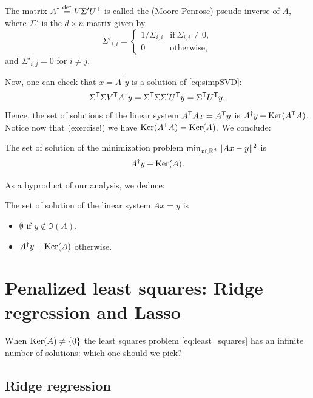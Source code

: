 \documentclass[11pt,nocut]{article}
\begin{document}
\begin{definition}
	The matrix $A^{\dagger} \overset{\rm def}{=} V \Sigma' U^{{\sf T}}$ is called the (Moore-Penrose) pseudo-inverse of $A$, where $\Sigma'$ is the $d \times n$ matrix given by 
	$$
	\Sigma'_{i,i} =
	\begin{cases}
		1 / \Sigma_{i,i} & \text{if} \ \Sigma_{i,i} \neq 0, \\
		0 & \text{otherwise},
	\end{cases}
	$$
	and $\Sigma'_{i,j} = 0$ for $i \neq j$.
\end{definition}

Now, one can check that $x = A^{\dagger}y$ is a solution of \eqref{eq:simpSVD}:
$$
\Sigma^{{\sf T}} \Sigma V^{{\sf T}} A^{\dagger} y =
\Sigma^{{\sf T}} \Sigma \Sigma' U^{{\sf T}} y =
\Sigma^{{\sf T}} U^{{\sf T}} y.
$$
Hence, the set of solutions of the linear system $A^{{\sf T}} A x = A^{{\sf T}} y$ is $A^{\dagger} y + {{\rm Ker}}(A^{{\sf T}}A)$. Notice now that (exercise!) we have ${{\rm Ker}}(A^{{\sf T}} A) = {{\rm Ker}}(A)$.
We conclude:

\begin{proposition}\label{prop:least_squares}
	The set of solution of the minimization problem $\min_{x \in \mathbb{R}^d} \|Ax - y\|^2$ is
	$$
	A^{\dagger} y + {{\rm Ker}}(A).
	$$
\end{proposition}

As a byproduct of our analysis, we deduce:
\begin{corollary}\label{cor:linear_system}
	The set of solution of the linear system $Ax = y$ is
	\begin{itemize}
		\item $\emptyset$ if $y \not\in \Im(A)$.
		\item $A^{\dagger}y + {{\rm Ker}}(A)$ otherwise.
	\end{itemize}
\end{corollary}


\section{Penalized least squares: Ridge regression and Lasso}

When ${{\rm Ker}}(A) \neq \{0\}$ the least squares problem \eqref{eq:least_squares} has an infinite number of solutions: which one should we pick?

\subsection{Ridge regression}
\end{document}
